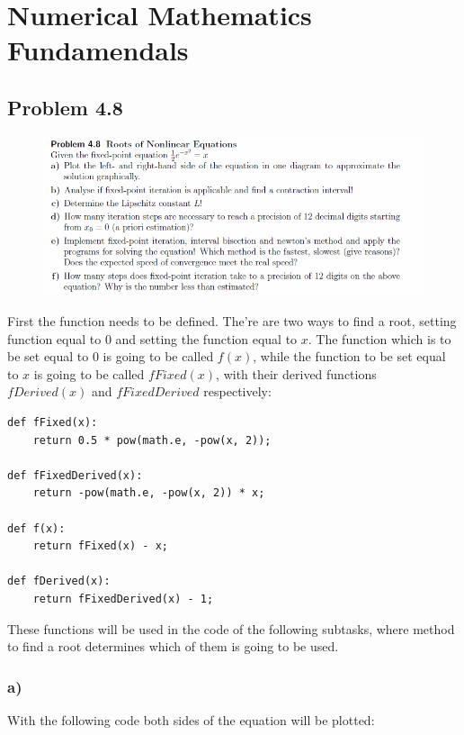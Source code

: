 \section{Numerical Mathematics Fundamendals}

\subsection{Problem 4.8}

\begin{figure}[!ht]
\includegraphics[width=1\textwidth]{chapters/images/desc-4-8}
\end{figure}

First the function needs to be defined. The're are two ways to find a root, setting function equal to $0$ and setting the function equal to $x$. The function which is to be set equal to $0$ is going to be called $f(x)$, while the function to be set equal to $x$ is going to be called $fFixed(x)$, with their derived functions $fDerived(x)$ and $fFixedDerived$ respectively:

\begin{lstlisting}[caption=Different functions for the equation]
def fFixed(x):
	return 0.5 * pow(math.e, -pow(x, 2));

def fFixedDerived(x):
	return -pow(math.e, -pow(x, 2)) * x;

def f(x):
	return fFixed(x) - x;

def fDerived(x):
	return fFixedDerived(x) - 1;
\end{lstlisting}

These functions will be used in the code of the following subtasks, where method to find a root determines which of them is going to be used.


\subsubsection{a)}

With the following code both sides of the equation will be plotted:

